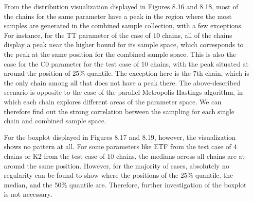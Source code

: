 From the distribution visualization displayed in Figures 8.16 and 8.18, most of the chains for the same parameter have a peak in the region where the most samples are generated in the combined sample collection, with a few exceptions. For instance, for the TT parameter of the case of $10$ chains, all of the chains display a peak near the higher bound for its sample space, which corresponds to the peak at the same position for the combined sample space. This is also the case for the C0 parameter for the test case of $10$ chains, with the peak situated at around the position of 25\% quantile. The exception here is the $7$th chain, which is the only chain among all that does not have a peak there. The above-described scenario is opposite to the case of the parallel Metropolis-Hastings algorithm, in which each chain explores different areas of the parameter space. We can therefore find out the strong correlation between the sampling for each single chain and combined sample space.

For the boxplot displayed in Figures 8.17 and 8.19, however, the visualization shows no pattern at all. For some parameters like ETF from the test case of $4$ chains or K2 from the test case of $10$ chains, the medians across all chains are at around the same position. However, for the majority of cases, absolutely no regularity can be found to show where the positions of the 25\% quantile, the median, and the 50\% quantile are. Therefore, further investigation of the boxplot is not necessary.

